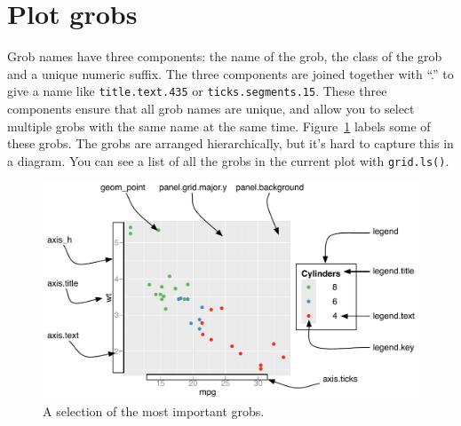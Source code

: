 \section{Plot grobs}
\label{sec:plot-grobs}

Grob names have three components: the name of the grob, the class of the grob and a unique numeric suffix.  The three components are joined together with ``.'' to give a name like {\tt title.text.435} or {\tt ticks.segments.15}.  These three components ensure that all grob names are unique, and allow you to select multiple grobs with the same name at the same time.  Figure~\ref{fig:grobs} labels some of these grobs.  The grobs are arranged hierarchically, but it's hard to capture this in a diagram.  You can see a list of all the grobs in the current plot with {\tt grid.ls()}.  

\begin{figure}[htbp]
  \centering
    \includegraphics[width=\linewidth]{grid-grobs}
  \caption{A selection of the most important grobs.}
  \label{fig:grobs}
\end{figure}


